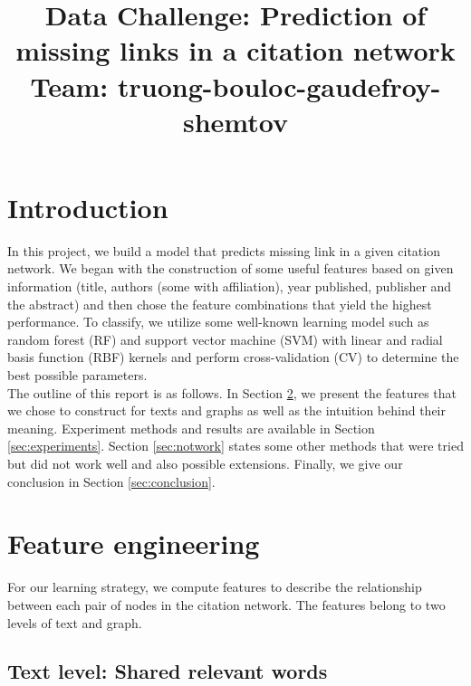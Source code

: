 \documentclass{article}
\title{Data Challenge: Prediction of missing links in a citation network\\Team: truong-bouloc-gaudefroy-shemtov}
\begin{document}
\ninept

\maketitle


\section{Introduction}

In this project, we build a model that predicts missing link in a given citation network. We began with the construction of some useful features based on given information (title, authors (some with affiliation), year published, publisher and the abstract) and then chose the feature combinations that yield the highest performance. To classify, we utilize some well-known learning model such as random forest (RF) and support vector machine (SVM) with linear and radial basis function (RBF) kernels and perform cross-validation (CV) to determine the best possible parameters.\\
The outline of this report is as follows. In Section \ref{sec:feature}, we present the features that we chose to construct for texts and graphs as well as the intuition behind their meaning. Experiment methods and results are available in Section \ref{sec:experiments}. Section \ref{sec:notwork} states some other methods that were tried but did not work well and also possible extensions. Finally, we give our conclusion in Section \ref{sec:conclusion}.

\section{Feature engineering}
\label{sec:feature}

For our learning strategy, we compute features to describe the relationship between each pair of nodes in the citation network. The features belong to two levels of text and graph.

\subsection{Text level: Shared relevant words}
\end{document}
